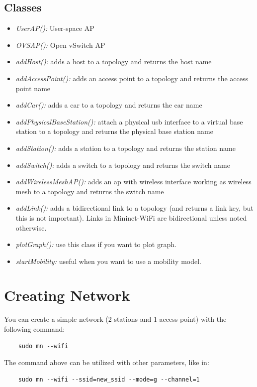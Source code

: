 \subsection{Classes}

\begin{itemize}
\item \textit{UserAP():} User-space AP
\item \textit{OVSAP():} Open vSwitch AP
\item \textit{addHost():} adds a host to a topology and returns the host name
\item \textit{addAccessPoint():} adds an access point to a topology and returns the access point name
\item \textit{addCar():} adds a car to a topology and returns the car name
\item \textit{addPhysicalBaseStation():} attach a physical usb interface to a virtual base station to a topology and returns the physical base station name
\item \textit{addStation():} adds a station to a topology and returns the station name
\item \textit{addSwitch():} adds a switch to a topology and returns the switch name
\item \textit{addWirelessMeshAP():} adds an ap with wireless interface working as wireless mesh to a topology and returns the switch name
\item \textit{addLink():} adds a bidirectional link to a topology (and returns a link key, but this is not important). Links in Mininet-WiFi are bidirectional unless noted otherwise.

\item \textit{plotGraph():} use this class if you want to plot graph.
\item \textit{startMobility:} useful when you want to use a mobility model.
\end{itemize}



\section{Creating Network}

You can create a simple network (2 stations and 1 access point) with the following command:
\begin{verbatim}
    sudo mn --wifi
\end{verbatim}

\noindent The command above can be utilized with other parameters, like in:
\begin{verbatim}
    sudo mn --wifi --ssid=new_ssid --mode=g --channel=1
\end{verbatim}

